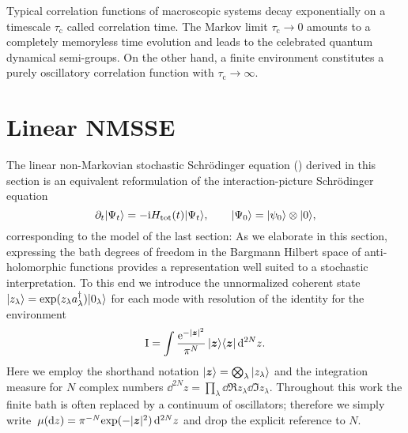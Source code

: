 Typical correlation functions of macroscopic systems decay exponentially on a timescale $\tau_\mathrm{c}$ called correlation time.
The Markov limit $\tau_\mathrm{c} \to 0$ amounts to a completely memoryless time evolution and leads to the celebrated quantum dynamical semi-groups.
On the other hand, a finite environment constitutes a purely oscillatory correlation function with $\tau_\mathrm{c} \to \infty$.

\section{Linear NMSSE}
\label{sec:nmqsd.lin_nmsse}
%

The linear non-Markovian stochastic Schrödinger equation (\NMSSE) derived in this section is an equivalent reformulation of the interaction-picture Schrödinger equation
\begin{equation}
  \partial_t | \Psi_t \rangle = -\mathrm{i} H_\mathrm{tot}(t) | \Psi_t \rangle, \qquad | \Psi_0 \rangle = | \psi_0 \rangle \otimes | 0 \rangle,
  \label{eq:nmqsd.schroedinger_ia}
\end{equation}
corresponding to the model of the last section:
As we elaborate in this section, expressing the bath degrees of freedom in the Bargmann Hilbert space of anti-holomorphic functions\cite{Ba61_coherent_states} provides a representation well suited to a stochastic interpretation.
To this end we introduce the unnormalized coherent state $\ket{z_\lambda} = \exp(z_\lambda \adj{a}_\lambda)\ket{0_\lambda}$ for each mode with resolution of the identity for the environment
\begin{equation}
  \unit = \int \frac{\exp[-\abs{\zz}^2]}{\pi^N} \, \ket{\zz}\bra{\zz} \dd^{2N}z.
  \label{eq:nmqsd.identity}
\end{equation}
Here we employ the shorthand notation $| \boldsymbol{z} \rangle = \bigotimes_\lambda | z_\lambda \rangle$ and the  integration measure for $N$ complex numbers $\dd^{2N}z = \prod_\lambda \dd\Re z_\lambda \dd\Im z_\lambda$.
Throughout this work the finite bath is often replaced by a continuum of oscillators; therefore we simply write $\mudz = \pi^{-N} \exp(-\abs{\vec z}^2) \dd^{2N}z$ and drop the explicit reference to $N$.

